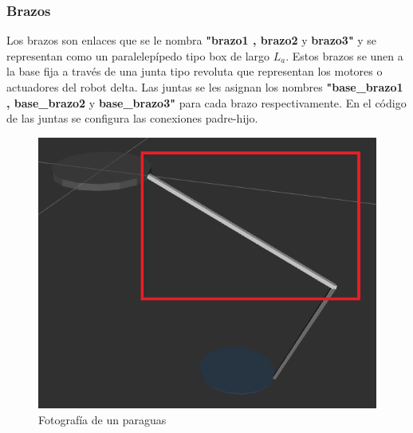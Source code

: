       \newpage

       \subsubsection{Brazos}
        Los brazos son enlaces que se le nombra \textbf{"brazo1 , brazo2} y \textbf{brazo3"} y se representan como un paralelepípedo tipo box de largo \textbf{$L_a$}. Estos brazos se unen a la base fija a través de una junta tipo revoluta que representan los motores o actuadores del robot delta. Las juntas se les asignan los nombres \textbf{"base\_brazo1 , base\_brazo2} y \textbf{base\_brazo3"} para cada brazo respectivamente. En el código de las juntas se configura las conexiones padre-hijo.
        
        
             \begin{figure}[h]
                \centering
                \includegraphics[width=0.4\linewidth]{Main/Chapter6/Images6/cap6_brazo.png}
                \caption{Fotografía de un paraguas}
                \label{f:Cap6_urdf_2}
            \end{figure}  
            

